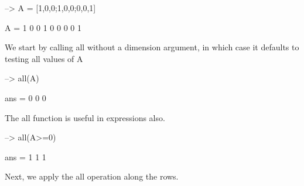 \begin{DoxyVerbInclude}
--> A = [1,0,0;1,0,0;0,0,1]

A = 
 1 0 0 
 1 0 0 
 0 0 1 
\end{DoxyVerbInclude}


We start by calling {\ttfamily all} without a dimension argument, in which case it defaults to testing all values of {\ttfamily A}


\begin{DoxyVerbInclude}
--> all(A)

ans = 
 0 0 0 
\end{DoxyVerbInclude}


The {\ttfamily all} function is useful in expressions also.


\begin{DoxyVerbInclude}
--> all(A>=0)

ans = 
 1 1 1 
\end{DoxyVerbInclude}


Next, we apply the {\ttfamily all} operation along the rows.



